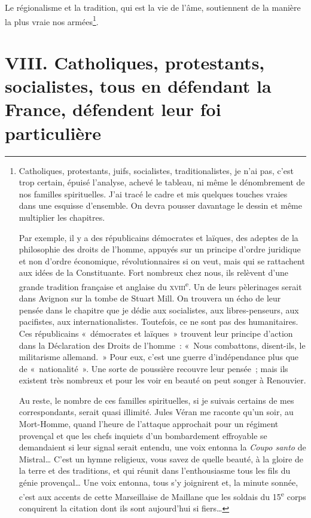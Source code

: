 \documentclass[french,twoside]{book} %
\newcommand\chapteropen{} %
\newcommand\chapterclose{} %
\begin{document}
Le régionalisme et la tradition, qui est la vie de l’âme, soutiennent de la manière la plus vraie nos armées\footnote{\noindent Catholiques, protestants, juifs, socialistes, traditionalistes, je n’ai pas, c’est trop certain, épuisé l’analyse, achevé le tableau, ni même le dénombrement de nos familles spirituelles. J’ai tracé le cadre et mis quelques touches vraies dans une esquisse d’ensemble. On devra pousser davantage le dessin et même multiplier les chapitres.‌\par
 Par exemple, il y a des républicains démocrates et laïques, des adeptes de la philosophie des droits de l’homme, appuyés sur un principe d’ordre juridique et non d’ordre économique, révolutionnaires si on veut, mais qui se rattachent aux idées de la Constituante. Fort nombreux chez nous, ils relèvent d’une grande tradition française et anglaise du \textsc{xviii}\textsuperscript{e}. Un de leurs pèlerinages serait dans Avignon sur la tombe de Stuart Mill. On trouvera un écho de leur pensée dans le chapitre que je dédie aux socialistes, aux libres-penseurs, aux pacifistes, aux internationalistes. Toutefois, ce ne sont pas des humanitaires. Ces républicains « démocrates et laïques » trouvent leur principe d’action dans la Déclaration des Droits de l’homme : « Nous combattons, disent-ils, le militarisme allemand. » Pour eux, c’est une guerre d’indépendance plus que de « nationalité ». Une sorte de poussière recouvre leur pensée ; mais ils existent très nombreux et pour les voir en beauté on peut songer à Renouvier.‌\par
 Au reste, le nombre de ces familles spirituelles, si je suivais certains de mes correspondants, serait quasi illimité. Jules Véran me raconte qu’un soir, au Mort-Homme, quand l’heure de l’attaque approchait pour un régiment provençal et que les chefs inquiets d’un bombardement effroyable se demandaient si leur signal serait entendu, une voix entonna la {\itshape Coupo santo} de Mistral… C’est un hymne religieux, vous savez de quelle beauté, à la gloire de la terre et des traditions, et qui réunit dans l’enthousiasme tous les fils du génie provençal… Une voix entonna, tous s’y joignirent et, la minute sonnée, c’est aux accents de cette Marseillaise de Maillane que les soldais du 15\textsuperscript{e} corps conquirent la citation dont ils sont aujourd’hui si fiers…
 }.‌
\chapterclose


\chapteropen
\chapter[{VIII. Catholiques, protestants, socialistes, tous en défendant la France, défendent leur foi particulière}]{VIII. Catholiques, protestants, socialistes, tous en défendant la France, défendent leur foi particulière}\renewcommand{\leftmark}{VIII. Catholiques, protestants, socialistes, tous en défendant la France, défendent leur foi particulière}
\end{document}
